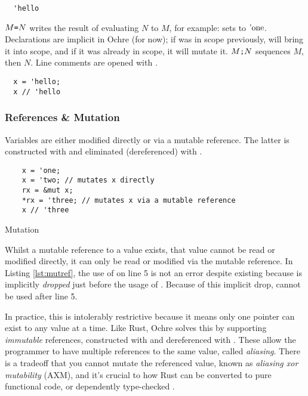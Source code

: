 \documentclass[12pt,twoside]{report}
\begin{document}
\begin{verbatim}
  'hello
\end{verbatim}

$M \text{\texttt{=}} N$ writes the result of evaluating $N$ to $M$, for example:  sets  to $\text{'one}$. Declarations are implicit in Ochre (for now); if  was in scope previously,  will bring it into scope, and if it was already in scope, it will mutate it. $M \text{\texttt{;}} N$ sequences $M$, then $N$. Line comments are opened with \mono{//}.

\begin{verbatim}
  x = 'hello;
  x // 'hello
\end{verbatim}

\subsubsection{References \& Mutation}
Variables are either modified directly or via a mutable reference. The latter is constructed with  and eliminated (dereferenced) with \mono{*}.

\begin{listing}[H]
  \begin{verbatim}
    x = 'one;
    x = 'two; // mutates x directly
    rx = &mut x;
    *rx = 'three; // mutates x via a mutable reference
    x // 'three
  \end{verbatim}
  \caption{Mutation}
  \label{lst:mutref}
\end{listing}

Whilst a mutable reference to a value exists, that value cannot be read or modified directly, it can only be read or modified via the mutable reference. In Listing \ref{lst:mutref}, the use of  on line 5 is not an error despite  existing because is implicitly \textit{dropped} just before the usage of . Because of this implicit drop,  cannot be used after line 5.

In practice, this is intolerably restrictive because it means only one pointer can exist to any value at a time. Like Rust, Ochre solves this by supporting \textit{immutable} references, constructed with \mono{\&} and dereferenced with \mono{*}. These allow the programmer to have multiple references to the same value, called \textit{aliasing}. There is a tradeoff that you cannot mutate the referenced value, known as \textit{aliasing xor mutability} (AXM), and it's crucial to how Rust can be converted to pure functional code, or dependently type-checked \citep{aeneas,ullrichKhaElectrolysis2024}.
\end{document}
